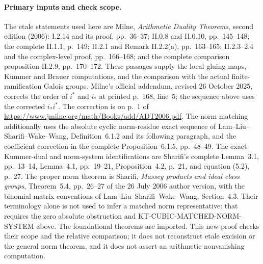 \paragraph{Primary inputs and check scope.}
The etale statements used here are Milne,
\emph{Arithmetic Duality Theorems}, second edition (2006):
I.2.14 and its proof, pp.~36--37; II.0.8 and II.0.10,
pp.~145--148; the complete II.1.1, p.~149; II.2.1 and
Remark II.2.2(a), pp.~163--165; II.2.3--2.4 and the complex-level proof,
pp.~166--168; and the complete comparison proposition
II.2.9, pp.~170--172.  These passages supply the local
gluing maps, Kummer and Brauer computations, and the
comparison with the actual finite-ramification Galois
groups.  Milne's official addendum, revised 26 October 2025,
corrects the order of \(i^*\) and \(i_*\) at printed p.~168,
line~5; the sequence above uses the corrected \(i_*i^*\).
The correction is on p.~1 of
\url{https://www.jmilne.org/math/Books/add/ADT2006.pdf}.
The norm matching additionally uses the absolute cyclic
norm-residue exact sequence of Lam--Liu--Sharifi--Wake--Wang,
Definition~6.1.2 and its following paragraph, and the
coefficient correction in the complete Proposition~6.1.5,
pp.~48--49.  The exact Kummer-dual and norm-system
identifications are Sharifi's complete Lemma~3.1,
pp.~13--14, Lemma~4.1, pp.~19--21, Proposition~4.2,
p.~21, and equation (5.2), p.~27.
The proper norm theorem is Sharifi,
\emph{Massey products and ideal class groups},
Theorem~5.4, pp.~26--27 of the 26 July 2006 author
version, with the binomial matrix conventions of
Lam--Liu--Sharifi--Wake--Wang, Section~4.3.  Their
terminology alone is not used to infer a matched norm
representative: that requires the zero absolute
obstruction and KT-CUBIC-MATCHED-NORM-SYSTEM above.
The foundational theorems are imported.  This new proof
checks their scope and the relative comparison; it does
not reconstruct etale excision or the general norm
theorem, and it does not assert an arithmetic
nonvanishing computation.
